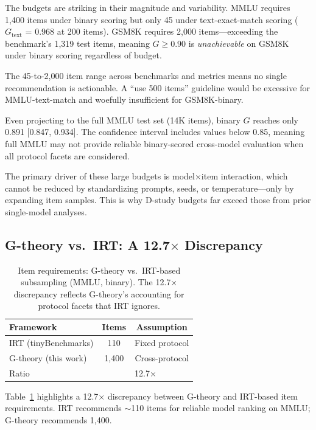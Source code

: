\documentclass[11pt,twocolumn]{article}
\newcommand{\Gcoeff}{\ensuremath{G}}
\begin{document}
The budgets are striking in their magnitude and variability. MMLU requires 1{,}400 items under binary scoring but only 45 under text-exact-match scoring ($\Gcoeff_\text{text}$ = 0.968 at 200 items). GSM8K requires 2{,}000 items---exceeding the benchmark's 1{,}319 test items, meaning $\Gcoeff \geq 0.90$ is \emph{unachievable} on GSM8K under binary scoring regardless of budget.

The 45-to-2{,}000 item range across benchmarks and metrics means no single recommendation is actionable. A ``use 500 items'' guideline would be excessive for MMLU-text-match and woefully insufficient for GSM8K-binary.

Even projecting to the full MMLU test set (14K items), binary $\Gcoeff$ reaches only 0.891 [0.847, 0.934]. The confidence interval includes values below 0.85, meaning full MMLU may not provide reliable binary-scored cross-model evaluation when all protocol facets are considered.

The primary driver of these large budgets is model$\times$item interaction, which cannot be reduced by standardizing prompts, seeds, or temperature---only by expanding item samples. This is why D-study budgets far exceed those from prior single-model analyses.

\subsection{G-theory vs.\ IRT: A 12.7$\times$ Discrepancy}
\label{sec:gtheory_irt}

\begin{table}[t]
\centering
\caption{Item requirements: G-theory vs.\ IRT-based subsampling (MMLU, binary). The 12.7$\times$ discrepancy reflects G-theory's accounting for protocol facets that IRT ignores.}
\label{tab:gtheory_irt}
\small
\begin{tabular}{@{}lcc@{}}
\toprule
\textbf{Framework} & \textbf{Items} & \textbf{Assumption} \\
\midrule
IRT (tinyBenchmarks) & 110 & Fixed protocol \\
G-theory (this work) & 1{,}400 & Cross-protocol \\
\midrule
Ratio & \multicolumn{2}{c}{12.7$\times$} \\
\bottomrule
\end{tabular}
\vspace{-2mm}
\end{table}

Table~\ref{tab:gtheory_irt} highlights a 12.7$\times$ discrepancy between G-theory and IRT-based \cite{polo2024tinybenchmarks} item requirements. IRT recommends $\sim$110 items for reliable model ranking on MMLU; G-theory recommends 1{,}400.
\end{document}

